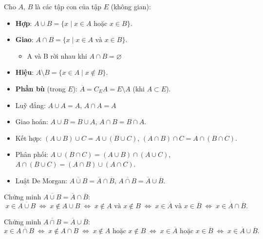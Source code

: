 \documentclass[12pt,a4paper]{article}
\begin{document}
\begin{dinhnghia}
  Cho $A$, $B$ là các tập con của tập $E$ (không gian):
  \begin{itemize}
    \item \textbf{Hợp}: $A \cup B = \{x \mid x \in A \text{ hoặc } x \in B\}$.
    \item \textbf{Giao}: $A \cap B = \{x \mid x \in A \text{ và } x \in B\}$.
    \begin{itemize}
        \item A và B rời nhau khi $A \cap B = \varnothing$
    \end{itemize}
    \item \textbf{Hiệu}: $A \setminus B = \{x \in A \mid x \notin B\}$.
    \item \textbf{Phần bù} (trong $E$): $\overline{A} = C_E A = E \setminus A$ (khi $A \subset E$).
  \end{itemize}
\end{dinhnghia}

\begin{tinhchat}[title={Tính chất các phép toán}]
  \begin{itemize}
    \item Luỹ đẳng: $A \cup A = A$, $A \cap A = A$
    \item Giao hoán: $A \cup B = B \cup A$, $A \cap B = B \cap A$.
    \item Kết hợp: $(A \cup B) \cup C = A \cup (B \cup C)$, $(A \cap B) \cap C = A \cap (B \cap C)$.
    \item Phân phối: $A \cup (B \cap C) = (A \cup B) \cap (A \cup C)$, $A \cap (B \cup C) = (A \cap B) \cup (A \cap C)$.
    \item Luật De Morgan: $\overline{A \cup B} = \overline{A} \cap \overline{B}$, $\overline{A \cap B} = \overline{A} \cup \overline{B}$.
  \end{itemize}
\end{tinhchat}

\begin{phuongphap}[title={Chứng minh De Morgan}]
  Chứng minh $\overline{A \cup B} = \overline{A} \cap \overline{B}$:
  \[
    x \in \overline{A \cup B} \;\Leftrightarrow\; x \notin A \cup B \;\Leftrightarrow\; x \notin A \text{ và } x \notin B \;\Leftrightarrow\; x \in \overline{A} \text{ và } x \in \overline{B} \;\Leftrightarrow\; x \in \overline{A} \cap \overline{B}.
  \]

  Chứng minh $\overline{A \cap B} = \overline{A} \cup \overline{B}$:
  \[
    x \in \overline{A \cap B} \;\Leftrightarrow\; x \notin A \cap B \;\Leftrightarrow\; x \notin A \text{ hoặc } x \notin B \;\Leftrightarrow\; x \in \overline{A} \text{ hoặc } x \in \overline{B} \;\Leftrightarrow\; x \in \overline{A} \cup \overline{B}.
  \]
\end{phuongphap}
\end{document}
